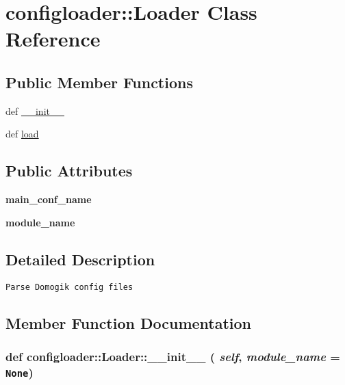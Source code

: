 \hypertarget{classconfigloader_1_1Loader}{
\section{configloader::Loader Class Reference}
\label{classconfigloader_1_1Loader}
}
\subsection*{Public Member Functions}
\begin{CompactItemize}
\item 
def \hyperlink{classconfigloader_1_1Loader_f16abb85a49b17461dcc647f4a2d5e00}{\_\-\_\-init\_\-\_\-}
\item 
def \hyperlink{classconfigloader_1_1Loader_52f1433b0ea290e45661b7473c3a68d4}{load}
\end{CompactItemize}
\subsection*{Public Attributes}
\begin{CompactItemize}
\item 
\hypertarget{classconfigloader_1_1Loader_1a7a816df2d21c388cbb544c79caa065}{
\textbf{main\_\-conf\_\-name}}
\label{classconfigloader_1_1Loader_1a7a816df2d21c388cbb544c79caa065}

\item 
\hypertarget{classconfigloader_1_1Loader_44604dd7b77716499655a4f39453a13d}{
\textbf{module\_\-name}}
\label{classconfigloader_1_1Loader_44604dd7b77716499655a4f39453a13d}

\end{CompactItemize}


\subsection{Detailed Description}


\footnotesize\begin{verbatim}
Parse Domogik config files
\end{verbatim}
\normalsize
 

\subsection{Member Function Documentation}
\hypertarget{classconfigloader_1_1Loader_f16abb85a49b17461dcc647f4a2d5e00}{
\subsubsection[\_\-\_\-init\_\-\_\-]{\setlength{\rightskip}{0pt plus 5cm}def configloader::Loader::\_\-\_\-init\_\-\_\- ( {\em self}, \/   {\em module\_\-name} = {\tt None})}}
\label{classconfigloader_1_1Loader_f16abb85a49b17461dcc647f4a2d5e00}




